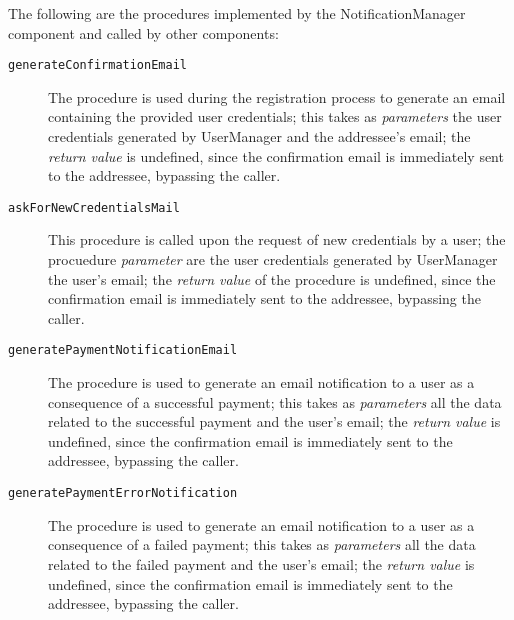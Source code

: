 The following are the procedures implemented by the NotificationManager component and called by other components:
\begin{description}
\item[\texttt{generateConfirmationEmail}] The procedure is used during the registration process to generate an email containing the provided user credentials; this takes as \textit{parameters} the user credentials generated by UserManager and the addressee's email; the \textit{return value} is undefined, since the confirmation email is immediately sent to the addressee, bypassing the caller.
\item[\texttt{askForNewCredentialsMail}] This procedure is called upon the request of new credentials by a user; the procuedure \textit{parameter} are the user credentials generated by UserManager the user's email; the \textit{return value} of the procedure is undefined, since the confirmation email is immediately sent to the addressee, bypassing the caller.
\item[\texttt{generatePaymentNotificationEmail}] The procedure is used to generate an email notification to a user as a consequence of a successful payment; this takes as \textit{parameters} all the data related to the successful payment and the user's email; the \textit{return value} is undefined, since the confirmation email is immediately sent to the addressee, bypassing the caller.
\item[\texttt{generatePaymentErrorNotification}] The procedure is used to generate an email notification to a user as a consequence of a failed payment; this takes as \textit{parameters} all the data related to the failed payment and the user's email; the \textit{return value} is undefined, since the confirmation email is immediately sent to the addressee, bypassing the caller.
\end{description}